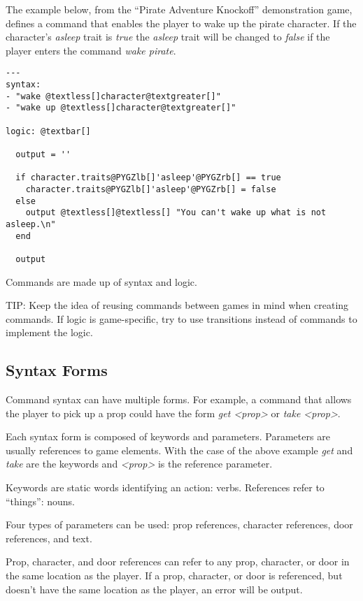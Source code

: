 \documentclass[letterpaper,10pt,english]{manual}
\begin{document}
The example below, from the ``Pirate Adventure Knockoff'' demonstration game, defines a command that enables the player to wake up the pirate character. If the character's \emph{asleep} trait is \emph{true} the \emph{asleep} trait will be changed to \emph{false} if the player enters the command \emph{wake pirate}.

\begin{Verbatim}[commandchars=@\[\]]
---
syntax:
- "wake @textless[]character@textgreater[]"
- "wake up @textless[]character@textgreater[]"

logic: @textbar[]

  output = ''

  if character.traits@PYGZlb[]'asleep'@PYGZrb[] == true
    character.traits@PYGZlb[]'asleep'@PYGZrb[] = false
  else
    output @textless[]@textless[] "You can't wake up what is not asleep.\n"
  end

  output
\end{Verbatim}

Commands are made up of syntax and logic.

TIP: Keep the idea of reusing commands between games in mind when creating commands. If logic is game-specific, try to use transitions instead of commands to implement the logic.


\subsection{Syntax Forms}

Command syntax can have multiple forms. For example, a command that allows the player to pick up a prop could have the form \emph{get \textless{}prop\textgreater{}} or \emph{take \textless{}prop\textgreater{}}.

Each syntax form is composed of keywords and parameters. Parameters are usually references to game elements. With the case of the above example \emph{get} and \emph{take} are the keywords and \emph{\textless{}prop\textgreater{}} is the reference parameter.

Keywords are static words identifying an action: verbs. References refer to ``things'': nouns.

Four types of parameters can be used: prop references, character references, door references, and text.

Prop, character, and door references can refer to any prop, character, or door in the same location as the player. If a prop, character, or door is referenced, but doesn't have the same location as the player, an error will be output.
\end{document}
